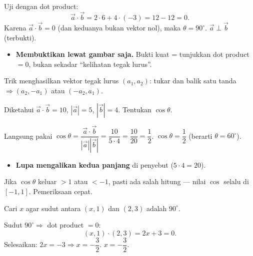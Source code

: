 \jawab
{} Uji dengan dot product:
\[
\vec a\cdot\vec b=2\cdot6+4\cdot(-3)=12-12=0.
\]
 Karena $\vec a\cdot\vec b=0$ (dan keduanya bukan vektor nol), maka
$\theta=90^\circ$.
\jadi $\vec a\perp\vec b$ (terbukti).

\begin{jebakan}
\begin{itemize}[leftmargin=*,topsep=2pt]
  \item \textbf{Membuktikan lewat gambar saja.} Bukti kuat = tunjukkan dot
  product $=0$, bukan sekadar ``kelihatan tegak lurus''.
\end{itemize}
\end{jebakan}

\begin{variasi}
Trik menghasilkan vektor tegak lurus $(a_1,a_2)$: tukar dan balik satu tanda
$\Rightarrow(a_2,-a_1)$ atau $(-a_2,a_1)$.
\end{variasi}

\begin{soalbox}{}
Diketahui $\vec a\cdot\vec b=10$, $|\vec a|=5$, $|\vec b|=4$. Tentukan
$\cos\theta$.
\end{soalbox}

\jawab
{} Langsung pakai $\cos\theta=\dfrac{\vec a\cdot\vec b}{|\vec a||\vec b|}
=\dfrac{10}{5\cdot4}=\dfrac{10}{20}=\dfrac12$.
\jadi $\cos\theta=\dfrac12$ (berarti $\theta=60^\circ$).

\begin{jebakan}
\begin{itemize}[leftmargin=*,topsep=2pt]
  \item \textbf{Lupa mengalikan kedua panjang} di penyebut ($5\cdot4=20$).
\end{itemize}
\end{jebakan}

\begin{variasi}
Jika $\cos\theta$ keluar $>1$ atau $<-1$, pasti ada salah hitung --- nilai
$\cos$ selalu di $[-1,1]$. Pemeriksaan cepat.
\end{variasi}

\begin{soalbox}{}
Cari $x$ agar sudut antara $(x,1)$ dan $(2,3)$ adalah $90^\circ$.
\end{soalbox}

\jawab
{} Sudut $90^\circ\Rightarrow$ dot product $=0$:
\[
(x,1)\cdot(2,3)=2x+3=0.
\]
 Selesaikan: $2x=-3\Rightarrow x=-\dfrac32$.
\jadi $x=-\dfrac32$.

